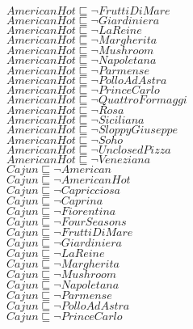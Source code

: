 \documentclass[a4paper,10pt]{article}
\begin{document}
 $AmericanHot \sqsubseteq  \lnot FruttiDiMare$\\ 
 $AmericanHot \sqsubseteq  \lnot Giardiniera$\\ 
 $AmericanHot \sqsubseteq  \lnot LaReine$\\ 
 $AmericanHot \sqsubseteq  \lnot Margherita$\\ 
 $AmericanHot \sqsubseteq  \lnot Mushroom$\\ 
 $AmericanHot \sqsubseteq  \lnot Napoletana$\\ 
 $AmericanHot \sqsubseteq  \lnot Parmense$\\ 
 $AmericanHot \sqsubseteq  \lnot PolloAdAstra$\\ 
 $AmericanHot \sqsubseteq  \lnot PrinceCarlo$\\ 
 $AmericanHot \sqsubseteq  \lnot QuattroFormaggi$\\ 
 $AmericanHot \sqsubseteq  \lnot Rosa$\\ 
 $AmericanHot \sqsubseteq  \lnot Siciliana$\\ 
 $AmericanHot \sqsubseteq  \lnot SloppyGiuseppe$\\ 
 $AmericanHot \sqsubseteq  \lnot Soho$\\ 
 $AmericanHot \sqsubseteq  \lnot UnclosedPizza$\\ 
 $AmericanHot \sqsubseteq  \lnot Veneziana$\\ 
 $Cajun \sqsubseteq  \lnot American$\\ 
 $Cajun \sqsubseteq  \lnot AmericanHot$\\ 
 $Cajun \sqsubseteq  \lnot Capricciosa$\\ 
 $Cajun \sqsubseteq  \lnot Caprina$\\ 
 $Cajun \sqsubseteq  \lnot Fiorentina$\\ 
 $Cajun \sqsubseteq  \lnot FourSeasons$\\ 
 $Cajun \sqsubseteq  \lnot FruttiDiMare$\\ 
 $Cajun \sqsubseteq  \lnot Giardiniera$\\ 
 $Cajun \sqsubseteq  \lnot LaReine$\\ 
 $Cajun \sqsubseteq  \lnot Margherita$\\ 
 $Cajun \sqsubseteq  \lnot Mushroom$\\ 
 $Cajun \sqsubseteq  \lnot Napoletana$\\ 
 $Cajun \sqsubseteq  \lnot Parmense$\\ 
 $Cajun \sqsubseteq  \lnot PolloAdAstra$\\ 
 $Cajun \sqsubseteq  \lnot PrinceCarlo$\\ 
\end{document}

